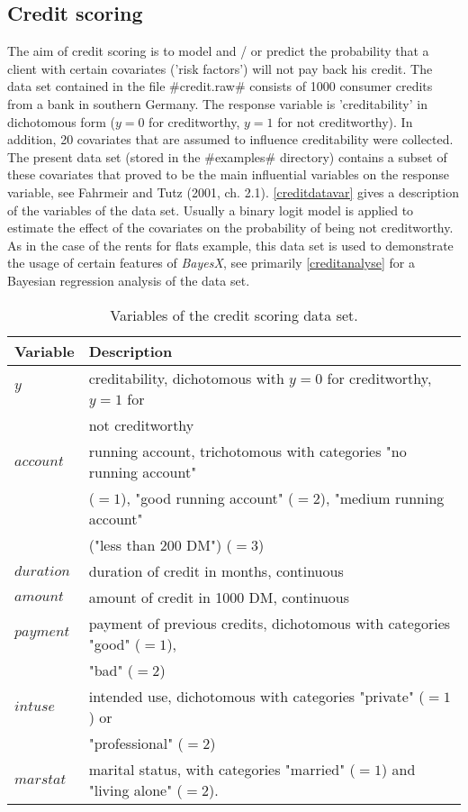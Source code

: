 \subsection{Credit scoring}
\label{creditdata}  

The aim of credit scoring is to model and / or predict the
probability that a client with certain covariates ('risk factors')
will not pay back his credit. The data set contained in the file
#credit.raw# consists of 1000 consumer credits from a bank in
southern Germany. The response variable is 'creditability' in
dichotomous form ($y=0$ for creditworthy, $y=1$ for not
creditworthy). In addition, 20 covariates that are assumed to
influence creditability were collected. The present data set
(stored in the #examples# directory) contains a subset of these
covariates that proved to be the main influential variables on the
response variable, see Fahrmeir and Tutz (2001, ch. 2.1).
\autoref{creditdatavar} gives a description of the variables of
the data set. Usually a binary logit model is applied to estimate
the effect of the covariates on the probability of being not
creditworthy. As in the case of the rents for flats example, this
data set is used to demonstrate the usage of certain features of
{\em BayesX}, see primarily \autoref{creditanalyse} for a Bayesian
regression analysis of the data set.

\begin{table}[ht]

\begin{tabular}{|l|l|}
\hline
{\bf Variable} & {\bf Description} \\
\hline
$y$ & creditability, dichotomous with $y=0$ for creditworthy, $y=1$ for \\
    & not creditworthy \\
$account$ & running account, trichotomous with categories "no
running account" \\& ($=1$),
    "good running account"
($=2$),  "medium running account" \\&("less than 200 DM") ($=3$)  \\
$duration$ & duration of credit in months, continuous \\
$amount$ & amount of credit in 1000 DM, continuous \\
$payment$ & payment of previous credits, dichotomous with categories "good" ($=1$), \\ & "bad" ($=2$)  \\
$intuse$ & intended use, dichotomous with categories "private" ($=1$) or \\ & "professional" ($=2$)  \\
$marstat$ & marital status, with categories "married" ($=1$) and "living alone" ($=2$). \\
\hline
\end{tabular}
{\em \caption{\label{creditdatavar}Variables of the credit scoring
data set.}}
\end{table}

